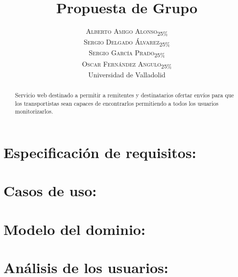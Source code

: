 \documentclass[10pt, a4paper,spanish]{article}
\title{\vspace{-15mm}\fontsize{24pt}{10pt}\selectfont\textbf{Propuesta de Grupo}} %
\author{
\large
\textsc{Alberto Amigo Alonso\textsubscript{25\%}}\\[2mm] %
\textsc{Sergio Delgado Álvarez\textsubscript{25\%}}\\[2mm] %
\textsc{Sergio García Prado\textsubscript{25\%}}\\[2mm] %
\textsc{Oscar Fernández Angulo\textsubscript{25\%}}\\[2mm] %
\normalsize Universidad de Valladolid \\ %
\vspace{-5mm}
}
\date{}
\begin{document}
	\maketitle %

	\thispagestyle{fancy} %


	\begin{abstract}
		\noindent Servicio web destinado a permitir a remitentes y destinatarios ofertar envíos para que los transportistas sean capaces de encontrarlos permitiendo a todos los usuarios monitorizarlos.
	\end{abstract}

	\section{Especificación de requisitos:}

		\paragraph{}


	\section{Casos de uso:}

		\paragraph{}


	\section{Modelo del dominio:}

		\paragraph{}


	\section{Análisis de los usuarios:}
\end{document}
